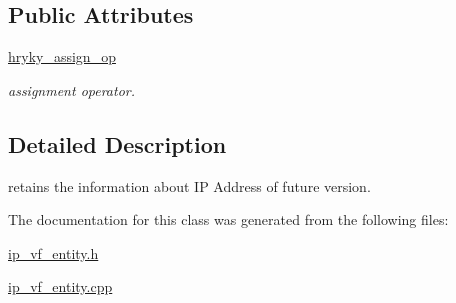 \subsection*{Public Attributes}
\begin{DoxyCompactItemize}
\item 
\hypertarget{classhryky_1_1ip_1_1vf_1_1_entity_ae7198a74c559dcd92db7d4556db5d3a8}{\hyperlink{classhryky_1_1ip_1_1vf_1_1_entity_ae7198a74c559dcd92db7d4556db5d3a8}{hryky\-\_\-assign\-\_\-op}}\label{classhryky_1_1ip_1_1vf_1_1_entity_ae7198a74c559dcd92db7d4556db5d3a8}

\begin{DoxyCompactList}\small\item\em assignment operator. \end{DoxyCompactList}\end{DoxyCompactItemize}


\subsection{Detailed Description}
retains the information about I\-P Address of future version. 

The documentation for this class was generated from the following files\-:\begin{DoxyCompactItemize}
\item 
\hyperlink{ip__vf__entity_8h}{ip\-\_\-vf\-\_\-entity.\-h}\item 
\hyperlink{ip__vf__entity_8cpp}{ip\-\_\-vf\-\_\-entity.\-cpp}\end{DoxyCompactItemize}

